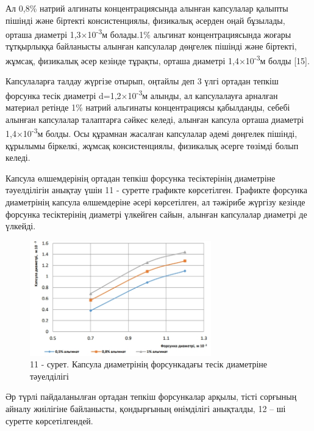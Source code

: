 \begin{multicols}{2}
Ал 0,8\% натрий алгинаты концентрациясында алынған капсулалар қалыпты
пішінді және біртекті консистенциялы, физикалық әсерден оңай бұзылады,
орташа диаметрі 1,3×10\textsuperscript{-3}м болады.1\% альгинат
концентрациясында жоғары тұтқырлыққа байланысты алынған капсулалар
дөңгелек пішінді және біртекті, жұмсақ, физикалық әсер кезінде тұрақты,
орташа диаметрі 1,4×10\textsuperscript{-3}м болды {[}15{]}.

Капсулаларға талдау жүргізе отырып, оңтайлы деп 3 үлгі ортадан тепкіш
форсунка тесік диаметрі d=1,2×10\textsuperscript{-3}м алынды, ал
капсулалауға арналған материал ретінде 1\% натрий альгинаты
концентрациясы қабылданды, себебі алынған капсулалар талаптарға сәйкес
келеді, алынған капсула орташа диаметрі 1,4×10\textsuperscript{-3}м
болды. Осы құрамнан жасалған капсулалар әдемі дөңгелек пішінді, құрылымы
біркелкі, жұмсақ консистенциялы, физикалық әсерге төзімді болып келеді.

Капсула өлшемдерінің ортадан тепкіш форсунка тесіктерінің диаметріне
тәуелділігін анықтау үшін 11 - суретте графикте көрсетілген. Графикте
форсунка диаметрінің капсула өлшемдеріне әсері көрсетілген, ал тәжірибе
жүргізу кезінде форсунка тесіктерінің диаметрі үлкейген сайын, алынған
капсулалар диаметрі де үлкейді.
\end{multicols}

\begin{figure}[H]
	\centering
	\includegraphics[width=0.7\textwidth]{media/pish/image44}
	\caption*{11 - сурет. Капсула диаметрінің форсункадағы тесік диаметріне тәуелділігі}
\end{figure}

Әр түрлі пайдаланылған ортадан тепкіш форсункалар арқылы, тісті сорғының
айналу жиілігіне байланысты, қондырғының өнімділігі анықталды, 12 -- ші
суретте көрсетілгендей.

